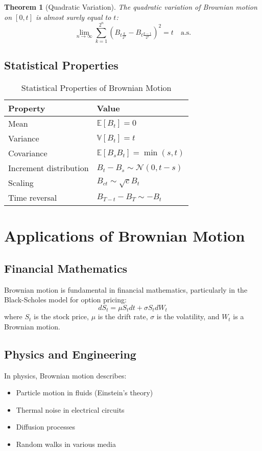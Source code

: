 \documentclass[12pt,a4paper,twoside]{article}
\newtheorem{theorem}{Theorem}[section]
\theoremstyle{definition}
\newcommand{\expect}[1]{\mathbb{E}\left[#1\right]}
\newcommand{\variance}[1]{\mathbb{V}\left[#1\right]}
\begin{document}
\begin{theorem}[Quadratic Variation]
The quadratic variation of Brownian motion on $[0,t]$ is almost surely equal to $t$:
\[
\lim_{n \to \infty} \sum_{k=1}^{2^n} \left(B_{t\frac{k}{2^n}} - B_{t\frac{k-1}{2^n}}\right)^2 = t \quad \text{a.s.}
\]
\end{theorem}

\subsection{Statistical Properties}

\begin{table}[H]
\centering
\caption{Statistical Properties of Brownian Motion}
\begin{tabular}{@{}ll@{}}
\toprule
\textbf{Property} & \textbf{Value} \\
\midrule
Mean & $\expect{B_t} = 0$ \\
Variance & $\variance{B_t} = t$ \\
Covariance & $\expect{B_s B_t} = \min(s,t)$ \\
Increment distribution & $B_t - B_s \sim \mathcal{N}(0, t-s)$ \\
Scaling & $B_{ct} \sim \sqrt{c} B_t$ \\
Time reversal & $B_{T-t} - B_T \sim -B_t$ \\
\bottomrule
\end{tabular}
\end{table}

\section{Applications of Brownian Motion}

\subsection{Financial Mathematics}

Brownian motion is fundamental in financial mathematics, particularly in the Black-Scholes model for option pricing:
\[
dS_t = \mu S_t dt + \sigma S_t dW_t
\]
where $S_t$ is the stock price, $\mu$ is the drift rate, $\sigma$ is the volatility, and $W_t$ is a Brownian motion.

\subsection{Physics and Engineering}

In physics, Brownian motion describes:
\begin{itemize}
\item Particle motion in fluids (Einstein's theory)
\item Thermal noise in electrical circuits
\item Diffusion processes
\item Random walks in various media
\end{itemize}
\end{document}
